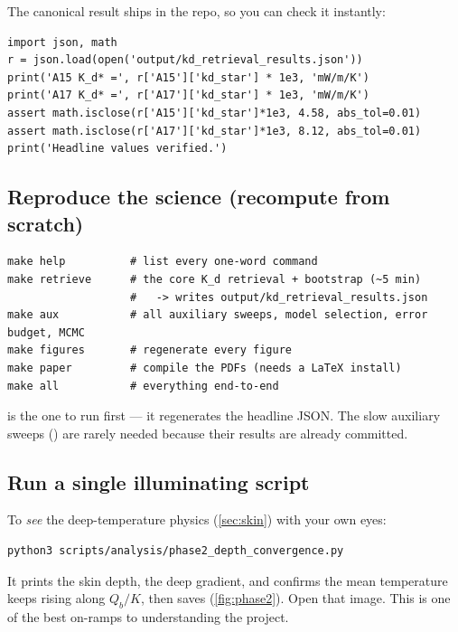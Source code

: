 The canonical result ships in the repo, so you can check it instantly:

\begin{lstlisting}[caption={Verify the committed headline \Kdstar\ values.}]
import json, math
r = json.load(open('output/kd_retrieval_results.json'))
print('A15 K_d* =', r['A15']['kd_star'] * 1e3, 'mW/m/K')
print('A17 K_d* =', r['A17']['kd_star'] * 1e3, 'mW/m/K')
assert math.isclose(r['A15']['kd_star']*1e3, 4.58, abs_tol=0.01)
assert math.isclose(r['A17']['kd_star']*1e3, 8.12, abs_tol=0.01)
print('Headline values verified.')
\end{lstlisting}

\subsection{Reproduce the science (recompute from scratch)}

\begin{lstlisting}[style=shellstyle,caption={The one-word \file{Makefile} targets.}]
make help          # list every one-word command
make retrieve      # the core K_d retrieval + bootstrap (~5 min)
                   #   -> writes output/kd_retrieval_results.json
make aux           # all auxiliary sweeps, model selection, error budget, MCMC
make figures       # regenerate every figure
make paper         # compile the PDFs (needs a LaTeX install)
make all           # everything end-to-end
\end{lstlisting}

 is the one to run first --- it regenerates the headline JSON.
The slow auxiliary sweeps () are rarely needed because their
results are already committed.

\subsection{Run a single illuminating script}

To \emph{see} the deep-temperature physics (\autoref{sec:skin}) with your own
eyes:

\begin{lstlisting}[style=shellstyle]
python3 scripts/analysis/phase2_depth_convergence.py
\end{lstlisting}

It prints the skin depth, the deep gradient, and confirms the mean temperature
keeps rising along $Q_b/K$, then saves
(\autoref{fig:phase2}). Open that image. This is one of the best on-ramps to
understanding the project.


